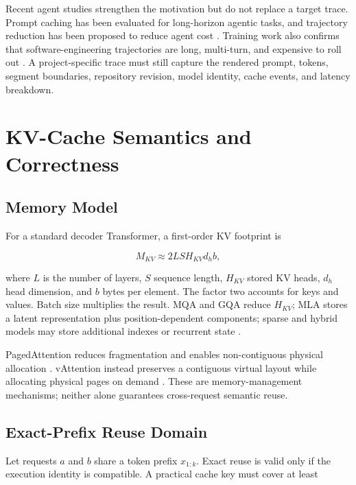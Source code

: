 \documentclass[conference,10pt]{IEEEtran}
\begin{document}
Recent agent studies strengthen the motivation but do not replace a target trace. Prompt caching has been evaluated for long-horizon agentic tasks, and trajectory reduction has been proposed to reduce agent cost \cite{lumer2026dont,xiao2025reducing}. Training work also confirms that software-engineering trajectories are long, multi-turn, and expensive to roll out \cite{golubev2025training,yang2025swesmith}. A project-specific trace must still capture the rendered prompt, tokens, segment boundaries, repository revision, model identity, cache events, and latency breakdown.

\section{KV-Cache Semantics and Correctness}

\subsection{Memory Model}

For a standard decoder Transformer, a first-order KV footprint is

\begin{equation}
M_{KV} \approx 2 L S H_{KV} d_h b,
\label{eq:kvsize}
\end{equation}

where $L$ is the number of layers, $S$ sequence length, $H_{KV}$ stored KV heads, $d_h$ head dimension, and $b$ bytes per element. The factor two accounts for keys and values. Batch size multiplies the result. MQA and GQA reduce $H_{KV}$; MLA stores a latent representation plus position-dependent components; sparse and hybrid models may store additional indexes or recurrent state \cite{shazeer2019fast,ainslie2023training,deepseekai2024deepseekv}.

PagedAttention reduces fragmentation and enables non-contiguous physical allocation \cite{kwon2023efficient}. vAttention instead preserves a contiguous virtual layout while allocating physical pages on demand \cite{prabhu2024vattention}. These are memory-management mechanisms; neither alone guarantees cross-request semantic reuse.

\subsection{Exact-Prefix Reuse Domain}

Let requests $a$ and $b$ share a token prefix $x_{1:k}$. Exact reuse is valid only if the execution identity is compatible. A practical cache key must cover at least
\end{document}
